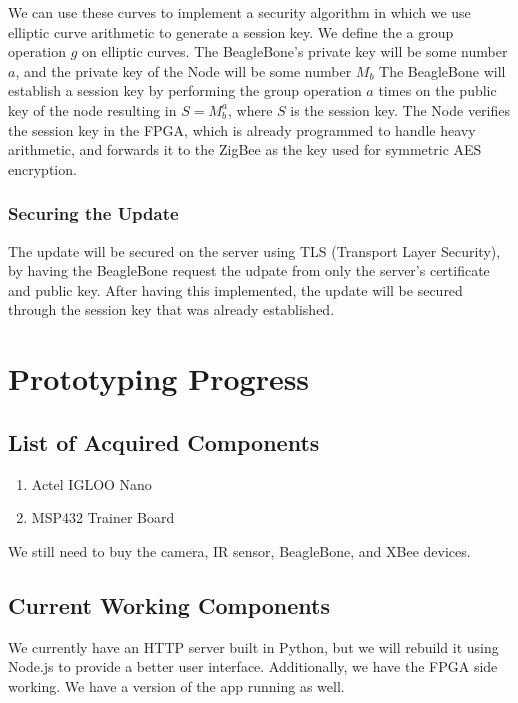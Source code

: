 \documentclass[11pt]{article}
\begin{document}
We can use these curves to implement a security algorithm in which we use elliptic curve arithmetic to generate a session key. We define the a group operation $g$ on elliptic curves. The BeagleBone's private key will be some number $a$, and the private key of the Node will be some number $M_{b}$ The BeagleBone will establish a session key by performing the group operation $a$ times on the public key of the node resulting in $S = M_b^a$, where $S$ is the session key. The Node verifies the session key in the FPGA, which is already programmed to handle heavy arithmetic, and forwards it to the ZigBee as the key used for symmetric AES encryption. 



\subsubsection{Securing the Update}

The update will be secured on the server using TLS (Transport Layer Security), by having the BeagleBone request the udpate from only the server's certificate and public key. After having this implemented, the update will be secured through the session key that was already established. 


\section{Prototyping Progress}

\subsection{List of Acquired Components}

\begin{enumerate}
    \item Actel IGLOO Nano
    \item MSP432 Trainer Board
\end{enumerate}

We still need to buy the camera, IR sensor, BeagleBone, and XBee devices.

\subsection{Current Working Components}

We currently have an HTTP server built in Python, but we will rebuild it using Node.js to provide a better user interface. Additionally, we have the FPGA side working. We have a version of the app running as well.
\end{document}
